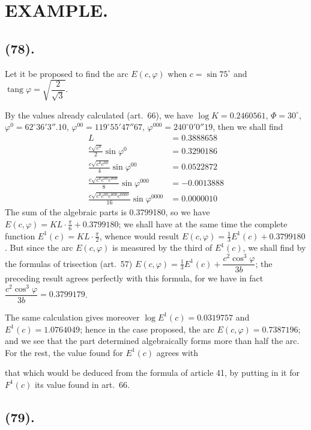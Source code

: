 \documentclass{article}
\begin{document}
\section*{EXAMPLE.}

\subsection*{(78).}

Let it be proposed to find the arc $E(c,\varphi)$ when $c=\sin 75^{\circ}$ and $\operatorname{tang}\varphi=\sqrt{\dfrac{2}{\sqrt{3}}}$.

By the values already calculated (art.~66), we have $\log K=0.2460561$, $\Phi=30^{\circ}$, $\varphi^{0}=62^{\circ}36'3''.10$, $\varphi^{00}=119^{\circ}55'47''67$, $\varphi^{000}=240^{\circ}0'0''19$, then we shall find
\[ \begin{aligned} L&=0.3888658\\ \frac{c\sqrt{c^{0}}}{2}\sin\varphi^{0}&=0.3290186\\ \frac{c\sqrt{c^{0}c^{00}}}{4}\sin\varphi^{00}&=0.0522872\\ \frac{c\sqrt{c^{0}c^{00}c^{000}}}{8}\sin\varphi^{000}&=-0.0013888\\ \frac{c\sqrt{c^{0}c^{00}c^{000}c^{0000}}}{16}\sin\varphi^{0000}&=0.0000010 \end{aligned} \]
The sum of the algebraic parts is 0.3799180, so we have $E(c,\varphi)=KL\cdot\frac{\pi}{6}+0.3799180$; we shall have at the same time the complete function $E^{1}(c)=KL\cdot\frac{\pi}{2}$, whence would result $E(c,\varphi)=\frac{1}{3}E^{1}(c)+0.3799180$. But since the arc $E(c,\varphi)$ is measured by the third of $E^{1}(c)$, we shall find by the formulas of trisection (art.~57) $E(c,\varphi)=\frac{1}{3}E^{1}(c)+\dfrac{c^{2}\cos^{3}\varphi}{3b}$; the preceding result agrees perfectly with this formula, for we have in fact $\dfrac{c^{2}\cos^{3}\varphi}{3b}=0.3799179$.

The same calculation gives moreover $\log E^{1}(c)=0.0319757$ and $E^{1}(c)=1.0764049$; hence in the case proposed, the arc $E(c,\varphi)=0.7387196$; and we see that the part determined algebraically forms more than half the arc. For the rest, the value found for $E^{1}(c)$ agrees with

that which would be deduced from the formula of article 41, by putting in it for $F^{1}(c)$ its value found in art.~66.

\subsection*{(79).}
\end{document}
